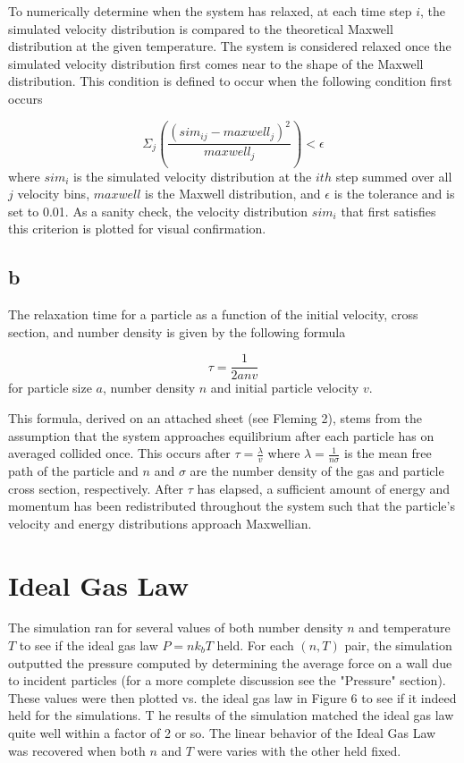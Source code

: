 \documentclass[12pt]{amsart}
\begin{document}
To numerically determine when the system has relaxed, at each time step $i$, the simulated velocity distribution is compared to the theoretical Maxwell distribution at the given temperature.  The system is considered relaxed once the simulated velocity distribution first comes near to the shape of the Maxwell distribution.  This condition is defined to occur when the following condition first occurs

$$ \Sigma_j(\frac{(sim_{ij} - maxwell_j)^2}{maxwell_j}) < \epsilon$$
\newline
where $sim_i$ is the simulated velocity distribution at the $ith$ step summed over all $j$ velocity bins, $maxwell$ is the Maxwell distribution, and $\epsilon$ is the tolerance and is set to 0.01.  As a sanity check, the velocity distribution $sim_i$ that first satisfies this criterion is plotted for visual confirmation.  

\subsection{b}

The relaxation time for a particle as a function of the initial velocity, cross section, and number density is given by the following formula

$$ \tau = \frac{1}{2anv} $$
\newline
for particle size $a$, number density $n$ and initial particle velocity $v$.
\newline
\par This formula, derived on an attached sheet (see Fleming 2), stems from the assumption that the system approaches equilibrium after each particle has on averaged collided once.  This occurs after $\tau = \frac{\lambda}{v}$ where $\lambda = \frac{1}{n\sigma}$ is the mean free path of the particle and $n$ and $\sigma$ are the number density of the gas and particle cross section, respectively.  After $\tau$ has elapsed, a sufficient amount of energy and momentum has been redistributed throughout the system such that the particle's velocity and energy distributions approach Maxwellian.  


\section{Ideal Gas Law}

The simulation ran for several values of both number density $n$ and temperature $T$ to see if the ideal gas law $P=nk_bT$ held.  For each $(n,T)$ pair, the simulation outputted the pressure computed by determining the average force on a wall due to incident particles (for a more complete discussion see the "Pressure" section).  These values were then plotted vs. the ideal gas law in Figure 6 to see if it indeed held for the simulations. T he results of the simulation matched the ideal gas law quite well within a factor of 2 or so. The linear behavior of the Ideal Gas Law was recovered when both $n$ and $T$ were varies with the other held fixed. 
\end{document}
